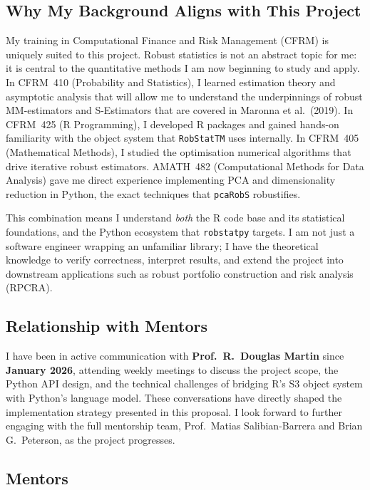 \documentclass[11pt, a4paper]{article}
\begin{document}
\subsection{Why My Background Aligns with This Project}

My training in Computational Finance and Risk Management (CFRM) is
uniquely suited to this project.
Robust statistics is not an abstract topic for me: it is central to the
quantitative methods I am now beginning to study and apply.
In CFRM~410 (Probability and Statistics), I learned estimation
theory and asymptotic analysis that will allow me to understand the underpinnings of robust MM-estimators and
S-Estimators that are covered in Maronna et al.\ (2019).
In CFRM~425 (R Programming), I developed R packages and gained hands-on
familiarity with the object system that \texttt{RobStatTM} uses
internally.
In CFRM~405 (Mathematical Methods), I studied the optimisation
numerical algorithms that drive iterative robust estimators.
AMATH~482 (Computational Methods for Data Analysis) gave me direct
experience implementing PCA and dimensionality reduction in Python, the
exact techniques that \texttt{pcaRobS} robustifies.

This combination means I understand \emph{both}
the R code base and its statistical foundations, and the Python
ecosystem that \texttt{robstatpy} targets.
I am not just a software engineer wrapping an unfamiliar library; I have
the theoretical knowledge to verify correctness, interpret results, and
extend the project into downstream applications such as robust portfolio
construction and risk analysis (RPCRA).

\subsection{Relationship with Mentors}

I have been in active communication with \textbf{Prof.\ R.\ Douglas Martin}
since \textbf{January 2026}, attending weekly meetings to discuss the project
scope, the Python API design, and the technical challenges of bridging R's S3
object system with Python's language model.
These conversations have directly shaped the implementation strategy presented
in this proposal.
I look forward to further engaging with the full mentorship team,
Prof.\ Matias Salibian-Barrera and Brian G.\ Peterson, as the project progresses.

\subsection{Mentors}
\end{document}
